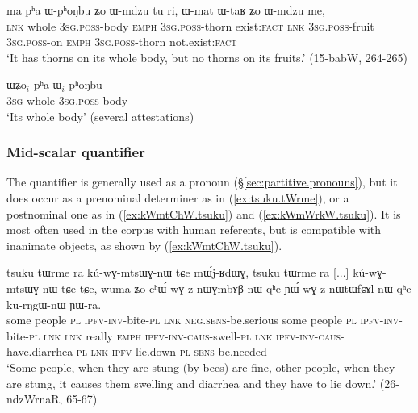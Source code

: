  \begin{exe}
\ex \label{ex:pha.WphoNbu}
\gll ma pʰa ɯ-pʰoŋbu ʑo ɯ-mdzu tu ri, ɯ-mat ɯ-taʁ ʑo ɯ-mdzu me,  \\
\textsc{lnk} whole \textsc{3sg}.\textsc{poss}-body \textsc{emph} \textsc{3sg}.\textsc{poss}-thorn exist:\textsc{fact} \textsc{lnk} \textsc{3sg}.\textsc{poss}-fruit  \textsc{3sg}.\textsc{poss}-on \textsc{emph}   \textsc{3sg}.\textsc{poss}-thorn not.exist:\textsc{fact} \\
\glt `It has thorns on its whole body, but no thorns on its fruits.' (15-babW, 264-265)
  \end{exe}
  
 \begin{exe}
\ex \label{ex:WZo.pha.WphoNbu}
\gll  ɯʑo$_i$  pʰa ɯ$_i$-pʰoŋbu  \\
\textsc{3sg} whole \textsc{3sg}.\textsc{poss}-body \\
\glt `Its whole body' (several attestations)
\end{exe}
  
\subsubsection{Mid-scalar quantifier} \label{sec:tsuku}
The quantifier  is generally used as a pronoun (§\ref{sec:partitive.pronouns}), but it does occur as a prenominal determiner as in (\ref{ex:tsuku.tWrme}), or a postnominal one as in (\ref{ex:kWmtChW.tsuku}) and (\ref{ex:kWmWrkW.tsuku}). It is most often used in the corpus with human referents, but is compatible with inanimate objects, as shown by (\ref{ex:kWmtChW.tsuku}).

\begin{exe}
\ex \label{ex:tsuku.tWrme}
\gll tsuku tɯrme ra kú-wɣ-mtsɯɣ-nɯ tɕe mɯ́j-ʁdɯɣ, tsuku tɯrme ra [...] kú-wɣ-mtsɯɣ-nɯ tɕe tɕe, wuma ʑo cʰɯ́-wɣ-z-nɯɣmbɤβ-nɯ qʰe ɲɯ́-wɣ-z-nɯtɯfɕɤl-nɯ qʰe ku-rŋgɯ-nɯ ɲɯ-ra.\\
some people \textsc{pl} \textsc{ipfv}-\textsc{inv}-bite-\textsc{pl} \textsc{lnk} \textsc{neg}.\textsc{sens}-be.serious some people \textsc{pl} { } \textsc{ipfv}-\textsc{inv}-bite-\textsc{pl} \textsc{lnk} \textsc{lnk} really \textsc{emph} \textsc{ipfv}-\textsc{inv}-\textsc{caus}-swell-\textsc{pl} \textsc{lnk}  \textsc{ipfv}-\textsc{inv}-\textsc{caus}-have.diarrhea-\textsc{pl} \textsc{lnk} \textsc{ipfv}-lie.down-\textsc{pl} \textsc{sens}-be.needed\\
\glt `Some people, when they are stung (by bees) are fine, other people, when they are stung, it causes them swelling and diarrhea and they have to lie down.' (26-ndzWrnaR, 65-67)
\end{exe}

